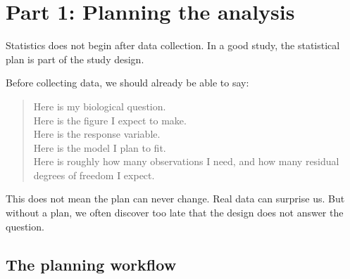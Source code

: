 \documentclass[
  letterpaper,
  8pt,
  a4paper]{book}
\begin{document}
\section*{Part 1: Planning the
analysis}\label{part-1-planning-the-analysis}


Statistics does not begin after data collection. In a good study, the
statistical plan is part of the study design.

Before collecting data, we should already be able to say:

\begin{quote}
Here is my biological question.\\
Here is the figure I expect to make.\\
Here is the response variable.\\
Here is the model I plan to fit.\\
Here is roughly how many observations I need, and how many residual
degrees of freedom I expect.
\end{quote}

This does not mean the plan can never change. Real data can surprise us.
But without a plan, we often discover too late that the design does not
answer the question.

\subsection*{The planning workflow}\label{the-planning-workflow}
\end{document}
